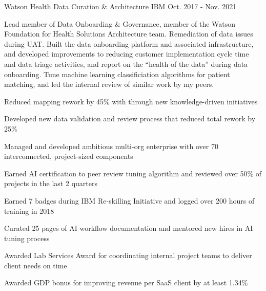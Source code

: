 \begin{cventries}
    \cventry
    {Watson Health} %
    {Data Curation \& Architecture} %
    {IBM} %
    {Oct. 2017 - Nov. 2021} %
    {
      \begin{cvparagraph}
        Lead member of Data Onboarding \& Governance, member of the Watson Foundation for Health Solutions Architecture team.  Remediation of data issues during UAT.  Built the data onboarding platform and associated infrastructure, and developed improvements to reducing customer implementation cycle time and data triage activities, and report on the “health of the data” during data onboarding.  Tune machine learning classificiation algorithms for patient matching, and led the internal review of similar work by my peers.
      \end{cvparagraph}
      \begin{cvitems} %
        \item {Reduced mapping rework by 45\% with through new knowledge-driven initiatives}
        \item {Developed new data validation and review process that reduced total rework by 25\%}
        \item {Managed and developed ambitious multi-org enterprise with over 70 interconnected, project-sized components}
        \item {Earned AI certification to peer review tuning algorithm and reviewed over 50\% of projects in the last 2 quarters}
        \item {Earned 7 badges during IBM Re-skilling Initiative and logged over 200 hours of training in 2018}
        \item {Curated 25 pages of AI workflow documentation and mentored new hires in AI tuning process}
        \item {Awarded Lab Services Award for coordinating internal project teams to deliver client needs on time}
        \item {Awarded GDP bonus for improving revenue per SaaS client by at least 1.34\%}
      \end{cvitems}
    }


\end{cventries}
